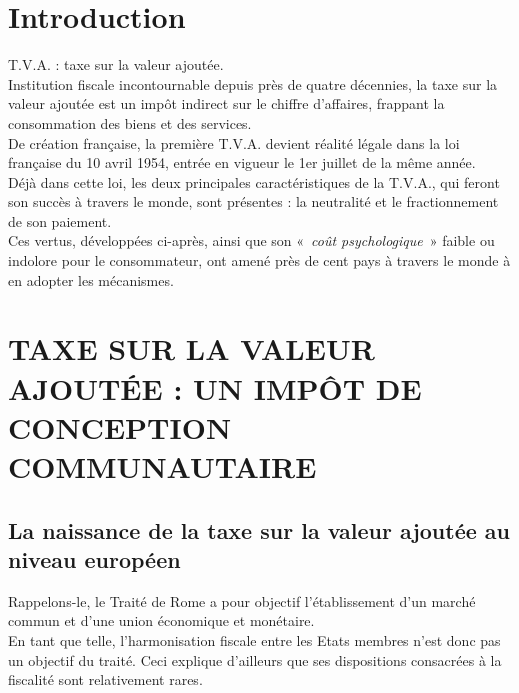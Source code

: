 \documentclass{book}
\begin{document}
\thispagestyle{empty}
\setcounter{page}{0}
\null
\newpage
{} \setcounter{page}{1} 




\tableofcontents



\chapter{Introduction}
 \setcounter{page}{1} 


T.V.A. : taxe sur la valeur ajoutée.\\

Institution fiscale incontournable depuis près de quatre décennies, la taxe sur la valeur ajoutée
est un impôt indirect sur le chiffre d'affaires, frappant la consommation des biens et des
services.\\

De création française, la première T.V.A. devient réalité légale dans la loi française du 10
avril 1954, entrée en vigueur le 1er juillet de la même année.\\

Déjà dans cette loi, les deux principales caractéristiques de la T.V.A., qui feront son succès à
travers le monde, sont présentes : la neutralité et le fractionnement de son paiement.\\

Ces vertus, développées ci-après, ainsi que son «~\textit{coût psychologique}~» faible ou indolore pour
le consommateur, ont amené près de cent pays à travers le monde à en adopter les
mécanismes.

\chapter{TAXE SUR LA VALEUR AJOUTÉE : UN IMPÔT DE CONCEPTION COMMUNAUTAIRE}

\section{La naissance de la taxe sur la valeur ajoutée au niveau européen}

Rappelons-le, le Traité de Rome a pour objectif l'établissement d'un marché commun et d'une
union économique et monétaire.\\

En tant que telle, l'harmonisation fiscale entre les Etats membres n'est donc pas un objectif du
traité. Ceci explique d'ailleurs que ses dispositions consacrées à la fiscalité sont relativement
rares.\\
\end{document}
